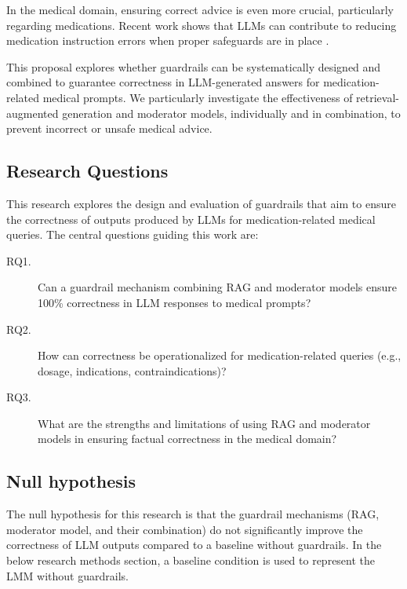 In the medical domain, ensuring correct advice is even more crucial, particularly regarding medications.
Recent work shows that LLMs can contribute to reducing medication instruction errors when proper safeguards are in place \citep{pais2024medication}.

This proposal explores whether guardrails can be systematically designed and combined to guarantee correctness in LLM-generated answers for medication-related medical prompts.
We particularly investigate the effectiveness of retrieval-augmented generation and moderator models, individually and in combination, to prevent incorrect or unsafe medical advice.

\subsection{Research Questions}
This research explores the design and evaluation of guardrails that aim to ensure the correctness of outputs produced by LLMs for medication-related medical queries.
The central questions guiding this work are:

\begin{description}
    \item[RQ1.] Can a guardrail mechanism combining RAG and moderator models ensure 100\% correctness in LLM responses to medical prompts?
    \item[RQ2.] How can correctness be operationalized for medication-related queries (e.g., dosage, indications, contraindications)?
    \item[RQ3.] What are the strengths and limitations of using RAG and moderator models in ensuring factual correctness in the medical domain?
\end{description}

\subsection{Null hypothesis}
The null hypothesis for this research is that the guardrail mechanisms (RAG, moderator model, and their combination)
do not significantly improve the correctness of LLM outputs compared to a baseline without guardrails.
In the below research methods section, a baseline condition is used to represent the LMM without guardrails.
